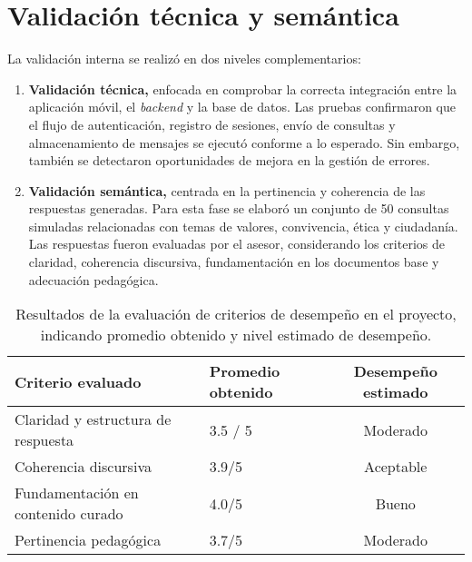 \section{Validación técnica y semántica}
La validación interna se realizó en dos niveles complementarios:
\begin{enumerate}
      \item \textbf{Validación técnica,} enfocada en comprobar la correcta integración entre la
            aplicación móvil, el \textit{backend} y la base de datos. Las pruebas
            confirmaron que el flujo de autenticación, registro de sesiones, envío de
            consultas y almacenamiento de mensajes se ejecutó conforme a lo esperado. Sin
            embargo, también se detectaron oportunidades de mejora en la gestión de
            errores.
      \item \textbf{Validación semántica,} centrada en la pertinencia y coherencia de las respuestas
            generadas. Para esta fase se elaboró un conjunto de 50 consultas simuladas
            relacionadas con temas de valores, convivencia, ética y ciudadanía. Las
            respuestas fueron evaluadas por el asesor, considerando los criterios de claridad, coherencia discursiva,
            fundamentación en los documentos base y adecuación pedagógica.
\end{enumerate}

\begin{table}[H]
      \centering
      \renewcommand{\arraystretch}{1.2}
      \begin{tabular}{|p{6cm}|l|c|}
            \hline
            \textbf{Criterio evaluado}         & \textbf{Promedio obtenido} & \textbf{Desempeño estimado} \\ \hline
            Claridad y estructura de respuesta & 3.5 / 5                    & Moderado                    \\ \hline
            Coherencia discursiva              & 3.9/5                      & Aceptable                   \\ \hline
            Fundamentación en contenido curado & 4.0/5                      & Bueno                       \\ \hline
            Pertinencia pedagógica             & 3.7/5                      & Moderado                    \\ \hline
      \end{tabular}
      \caption[Evaluación de criterios]{Resultados de la evaluación de criterios de desempeño en el proyecto, indicando promedio obtenido y nivel estimado de desempeño.}
      \label{tab:evaluacion-criterios}
\end{table}

